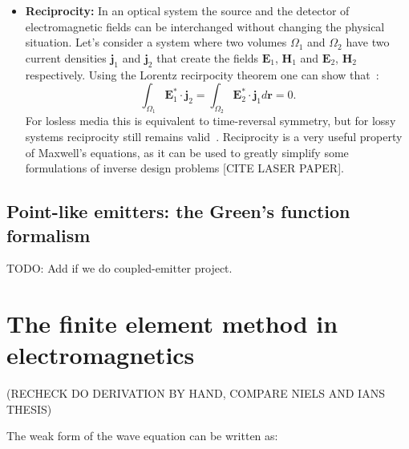 \begin{itemize}
    \item \textbf{Reciprocity:} In an optical system the source and the detector of electromagnetic fields can be interchanged without changing the physical situation. Let's consider a system where two volumes $\Omega_1$ and $\Omega_2$ 
    have two current densities $\mathbf{j}_1$ and $\mathbf{j}_2$ that create the fields $\mathbf{E}_1$, $\mathbf{H}_1$ and $\mathbf{E}_2$, $\mathbf{H}_2$ respectively. Using the Lorentz recirpocity theorem one can show that~\cite{novotny}:      
    \begin{equation}
        \int_{\Omega_1} \mathbf{E}_1^* \cdot \mathbf{j}_2 = \int_{\Omega_2}  \mathbf{E}_2^* \cdot \mathbf{j}_1 d\mathbf{r} = 0.
    \end{equation}
    For losless media this is equivalent to time-reversal symmetry, but for lossy systems reciprocity still remains valid~\cite{Carminati:98}. Reciprocity is a very useful property of Maxwell's equations, as it can be used to 
    greatly simplify some formulations of inverse design problems [CITE LASER PAPER].


\end{itemize}

\subsection*{Point-like emitters: the Green's function formalism}

TODO: Add if we do coupled-emitter project.

\section{The finite element method in electromagnetics}

(RECHECK DO DERIVATION BY HAND, COMPARE NIELS AND IANS THESIS)

The weak form of the wave equation can be written as:

